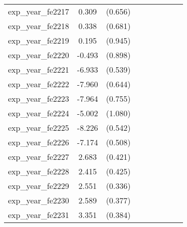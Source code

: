 {\begin{tabular}{l*{4}{cc}}
exp\_year\_fe2217&    0.309         &  (0.656)&                  &         &                  &         &                  &         \\
exp\_year\_fe2218&    0.338         &  (0.681)&                  &         &                  &         &                  &         \\
exp\_year\_fe2219&    0.195         &  (0.945)&                  &         &                  &         &                  &         \\
exp\_year\_fe2220&   -0.493         &  (0.898)&                  &         &                  &         &                  &         \\
exp\_year\_fe2221&   -6.933\sym{***}&  (0.539)&                  &         &                  &         &                  &         \\
exp\_year\_fe2222&   -7.960\sym{***}&  (0.644)&                  &         &                  &         &                  &         \\
exp\_year\_fe2223&   -7.964\sym{***}&  (0.755)&                  &         &                  &         &                  &         \\
exp\_year\_fe2224&   -5.002\sym{***}&  (1.080)&                  &         &                  &         &                  &         \\
exp\_year\_fe2225&   -8.226\sym{***}&  (0.542)&                  &         &                  &         &                  &         \\
exp\_year\_fe2226&   -7.174\sym{***}&  (0.508)&                  &         &                  &         &                  &         \\
exp\_year\_fe2227&    2.683\sym{***}&  (0.421)&                  &         &                  &         &                  &         \\
exp\_year\_fe2228&    2.415\sym{***}&  (0.425)&                  &         &                  &         &                  &         \\
exp\_year\_fe2229&    2.551\sym{***}&  (0.336)&                  &         &                  &         &                  &         \\
exp\_year\_fe2230&    2.589\sym{***}&  (0.377)&                  &         &                  &         &                  &         \\
exp\_year\_fe2231&    3.351\sym{***}&  (0.384)&                  &         &                  &         &                  &         \\

\end{tabular}}

